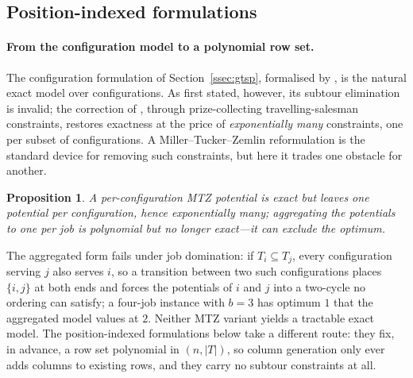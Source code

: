 \documentclass[11pt,a4paper]{article}
\theoremstyle{plain}
\newtheorem{proposition}{Proposition}
\theoremstyle{definition}
\theoremstyle{remark}
\begin{document}
\subsection{Position-indexed formulations}\label{ssec:pos}
\paragraph{From the configuration model to a polynomial row set.}
The configuration formulation of Section~\ref{ssec:gtsp}, formalised by
\citet{Colares2026Exact}, is the natural exact model over configurations. As first
stated, however, its subtour elimination is invalid; the correction of
\citet{Moreira2026}, through prize-collecting travelling-salesman constraints,
restores exactness at the price of \emph{exponentially many} constraints, one per
subset of configurations. A Miller--Tucker--Zemlin reformulation
\citep{Miller1960,DesrochersLaporte1991} is the standard device for removing such
constraints, but here it trades one obstacle for another.
\begin{proposition}\label{prop:mtz}
A per-configuration MTZ potential is exact but leaves one potential per configuration,
hence exponentially many; aggregating the potentials to one per job is polynomial but no
longer exact---it can exclude the optimum.
\end{proposition}
\noindent The aggregated form fails under job domination: if $T_i\subseteq T_j$, every
configuration serving $j$ also serves $i$, so a transition between two such
configurations places $\{i,j\}$ at both ends and forces the potentials of $i$ and $j$
into a two-cycle no ordering can satisfy; a four-job instance with $b=3$ has optimum $1$
that the aggregated model values at $2$. Neither MTZ variant yields a tractable exact
model. The position-indexed formulations below take a different route: they fix, in
advance, a row set polynomial in $(n,\lvert T\rvert)$, so column generation only ever
adds columns to existing rows, and they carry no subtour constraints at all.
\end{document}
